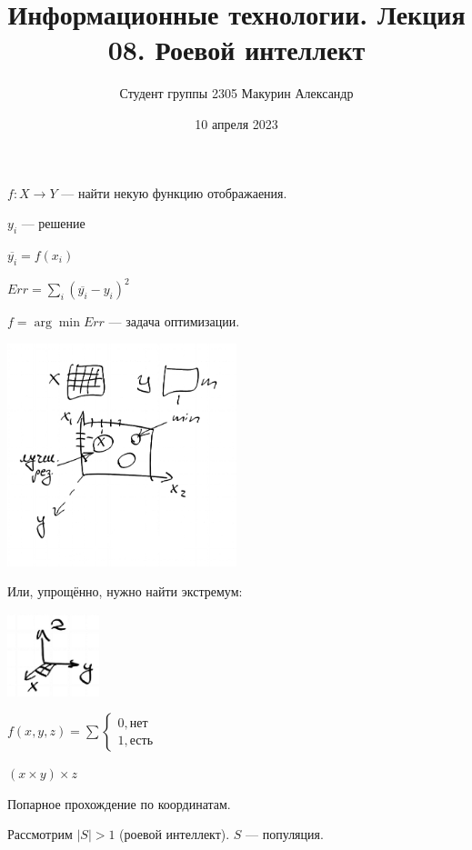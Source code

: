 \documentclass[12pt]{article}
\title{Информационные технологии. Лекция 08. Роевой интеллект}
\author{Студент группы 2305 Макурин Александр}
\date{10 апреля 2023}
\begin{document}
\maketitle
$f: X\rightarrow Y$ — найти некую функцию отображаения.

$y_i$ — решение

$\overline{y_i} = f(x_i)$

$Err = \sum_i(\overline{y_i} - y_i)^2$

$f = \arg \min Err$ — задача оптимизации.

\includegraphics[width=0.5\textwidth]{graphics/pic01.png}

Или, упрощённо, нужно найти экстремум:

\includegraphics[width=0.2\textwidth]{graphics/pic02.png}

$f(x, y, z) = \sum \begin{cases}
        0, \text{нет} \\
        1, \text{есть}
    \end{cases}$

$(x \times y) \times z$

Попарное прохождение по координатам.

Рассмотрим $|S| > 1$ (роевой интеллект). $S$ — популяция.
\end{document}
